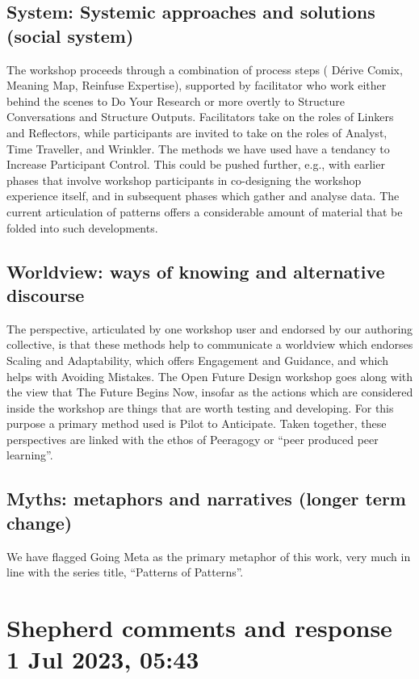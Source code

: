 \documentclass[acmlarge,timestamp]{acmart}
\begin{document}
\subsection{System: Systemic approaches and solutions (social system)}
The workshop proceeds through a combination of process steps ({\sc
  D\'erive Comix}, {\sc Meaning Map}, {\sc Reinfuse Expertise}),
supported by facilitator who work either behind the scenes to {\sc Do
  Your Research} or more overtly to {\sc Structure Conversations} and
{\sc Structure Outputs}.  Facilitators take on the roles of {\sc
  Linkers} and {\sc Reflectors}, while participants are invited to
take on the roles of {\sc Analyst}, {\sc Time Traveller}, and {\sc
  Wrinkler}.  The methods we have used have a tendancy to {\sc
  Increase Participant Control}.  This could be pushed further, e.g.,
with earlier phases that involve workshop participants in co-designing
the workshop experience itself, and in subsequent phases which gather
and analyse data.  The current articulation of patterns offers a
considerable amount of material that be folded into such developments.

\subsection{Worldview: ways of knowing and alternative discourse}
The perspective, articulated by one workshop user and endorsed by our
authoring collective, is that these methods help to communicate a
worldview which endorses {\sc Scaling and Adaptability}, which offers
{\sc Engagement and Guidance}, and which helps with {\sc Avoiding
  Mistakes}.  The Open Future Design workshop goes along with the view
that {\sc The Future Begins Now}, insofar as the actions which are
considered inside the workshop are things that are worth testing and
developing.  For this purpose a primary method used is {\sc Pilot to
  Anticipate}.  Taken together, these perspectives are linked with the
ethos of Peeragogy or “peer produced peer learning”.

\subsection{Myths: metaphors and narratives (longer term change)}
We have flagged {\sc Going Meta} as the primary metaphor of this work,
very much in line with the series title, “Patterns of Patterns”.

\section{Shepherd comments and response 1 Jul 2023, 05:43}
\end{document}
